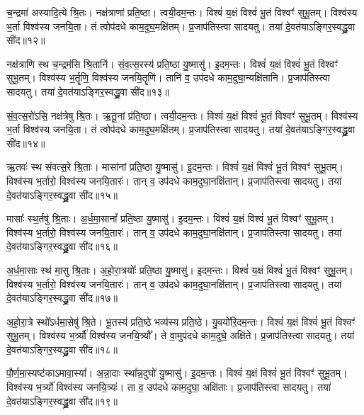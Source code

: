    च॒न्द्रमा॑ अस्यादि॒त्ये श्रि॒तः।
   नक्ष॑त्राणां प्रति॒ष्ठा।
   त्वयी॒दम॒न्तः।
   विश्वं॑ य॒क्षं विश्वं॑ भू॒तं विश्वꣳ॑ सुभू॒तम्।
   विश्व॑स्य भ॒र्ता विश्व॑स्य जनयि॒ता।
   तं त्वोप॑दधे काम॒दुघ॒मक्षि॑तम्।
   प्र॒जाप॑तिस्त्वा सादयतु।
   तया॑ दे॒वत॑याऽङ्गिर॒स्वद्ध्रु॒वा सी॑द॥१२॥

   नक्ष॑त्राणि स्थ च॒न्द्रम॑सि श्रि॒तानि॑।
   सं॒व॒त्स॒रस्य॑ प्रति॒ष्ठा यु॒ष्मासु॑। 
   इ॒दम॒न्तः।
   विश्वं॑ य॒क्षं विश्वं॑ भू॒तं विश्वꣳ॑ सुभू॒तम्।
   विश्व॑स्य भ॒र्तॄणि॒ विश्व॑स्य जनयि॒तॄणि॑।
   तानि॑ व॒ उप॑दधे काम॒दुघा॒न्यक्षि॑तानि।
   प्र॒जाप॑तिस्त्वा सादयतु।
   तया॑ दे॒वत॑याऽङ्गिर॒स्वद्ध्रु॒वा सी॑द॥१३॥

   सं॒व॒त्स॒रो॑ऽसि॒ नक्ष॑त्रेषु श्रि॒तः।
   ऋ॒तू॒नां प्र॑ति॒ष्ठा। 
   त्वयी॒दम॒न्तः।
   विश्वं॑ य॒क्षं विश्वं॑ भू॒तं विश्वꣳ॑ सुभू॒तम्।
   विश्व॑स्य भ॒र्ता विश्व॑स्य जनयि॒ता।
   तं त्वोप॑दधे काम॒दुघ॒मक्षि॑तम्।
   प्र॒जाप॑तिस्त्वा सादयतु।
   तया॑ दे॒वत॑याऽङ्गिर॒स्वद्ध्रु॒वा सी॑द॥१४॥

   ऋ॒तवः॑ स्थ संवत्स॒रे श्रि॒ताः।
   मासा॑नां प्रति॒ष्ठा यु॒ष्मासु॑। 
   इ॒दम॒न्तः।
   विश्वं॑ य॒क्षं विश्वं॑ भू॒तं विश्वꣳ॑ सुभू॒तम्।
   विश्व॑स्य भ॒र्तारो॒ विश्व॑स्य जनयि॒तारः॑।
   तान् व॒ उप॑दधे काम॒दुघा॒नक्षि॑तान्।
   प्र॒जाप॑तिस्त्वा सादयतु।
   तया॑ दे॒वत॑याऽङ्गिर॒स्वद्ध्रु॒वा सी॑द॥१५॥

   मासाः᳚ स्थ॒र्तषु॑ श्रि॒ताः।
   अ॒र्ध॒मा॒सानां᳚ प्रति॒ष्ठा यु॒ष्मासु॑। 
   इ॒दम॒न्तः।
   विश्वं॑ य॒क्षं विश्वं॑ भू॒तं विश्वꣳ॑ सुभू॒तम्।
   विश्व॑स्य भ॒र्तारो॒ विश्व॑स्य जनयि॒तारः॑।
   तान् व॒ उप॑दधे काम॒दुघा॒नक्षि॑तान्।
   प्र॒जाप॑तिस्त्वा सादयतु।
   तया॑ दे॒वत॑याऽङ्गिर॒स्वद्ध्रु॒वा सी॑द॥१६॥

   अ॒र्ध॒मा॒साः स्थ॑ मा॒सु श्रि॒ताः।
   अ॒हो॒रा॒त्रयोः᳚ प्रति॒ष्ठा यु॒ष्मासु॑। 
   इ॒दम॒न्तः।
   विश्वं॑ य॒क्षं विश्वं॑ भू॒तं विश्वꣳ॑ सुभू॒तम्।
   विश्व॑स्य भ॒र्तारो॒ विश्व॑स्य जनयि॒तारः॑।
   तान् व॒ उप॑दधे काम॒दुघा॒नक्षि॑तान्।
   प्र॒जाप॑तिस्त्वा सादयतु।
   तया॑ दे॒वत॑याऽङ्गिर॒स्वद्ध्रु॒वा सी॑द॥१७॥

   अ॒हो॒रा॒त्रे स्थो᳚ऽर्धमा॒सेषु॑ श्रि॒ते।
   भू॒तस्य॑ प्रति॒ष्ठे भव्य॑स्य प्रति॒ष्ठे।
   यु॒वयो॑रि॒दम॒न्तः।
   विश्वं॑ य॒क्षं विश्वं॑ भू॒तं विश्वꣳ॑ सुभू॒तम्।
   विश्व॑स्य भ॒र्त्र्यौ॑ विश्व॑स्य जनयि॒त्र्यौ᳚।
   ते वा॒मुप॑दधे काम॒दुघे॒ अक्षि॑ते।
   प्र॒जाप॑तिस्त्वा सादयतु।
   तया॑ दे॒वत॑याऽङ्गिर॒स्वद्ध्रु॒वा सी॑द॥१८॥

   पौ॒र्ण॒मा॒स्यष्ट॑काऽमावा॒स्या᳚।
   अ॒न्ना॒दाः स्था᳚न्न॒दुघो॑ यु॒ष्मासु॑। 
   इ॒दम॒न्तः।
   विश्वं॑ य॒क्षं विश्वं॑ भू॒तं विश्वꣳ॑ सुभू॒तम्।
   विश्व॑स्य भ॒र्त्र्यो॑ विश्व॑स्य जनयि॒त्र्यः॑।
   ता व॒ उप॑दधे काम॒दुघा॒ अक्षि॑ताः।
   प्र॒जाप॑तिस्त्वा सादयतु।
   तया॑ दे॒वत॑याऽङ्गिर॒स्वद्ध्रु॒वा सी॑द॥१९॥

